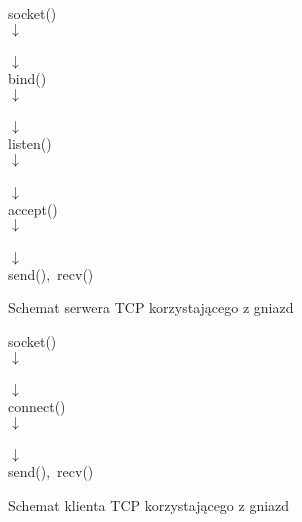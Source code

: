 \begin{table}[ht]
	\begin{center}

	 \mbox{socket()}                                   \\ $\downarrow$ \\
	                  \\ $\downarrow$ \\
	 \mbox{bind()}                                     \\ $\downarrow$ \\
	               \\ $\downarrow$ \\
	 \mbox{listen()}                                   \\ $\downarrow$ \\
	       \\ $\downarrow$ \\
	 \mbox{accept()}                                   \\ $\downarrow$ \\
	      \\ $\downarrow$ \\
	 \mbox{send(), recv()} \\ 

	\end{center}
\caption{Schemat serwera TCP korzystającego z gniazd} 
\label{tab:TCPServer}
\end{table}

\begin{table}[ht]
	\begin{center}

	 \mbox{socket()}                                   \\ $\downarrow$ \\
	                  \\ $\downarrow$ \\
	 \mbox{connect()}                                  \\ $\downarrow$ \\
	              \\ $\downarrow$ \\
	 \mbox{send(), recv()} \\ 

	\end{center}
\caption{Schemat klienta TCP korzystającego z gniazd} 
\label{tab:TCPKlient}
\end{table}

